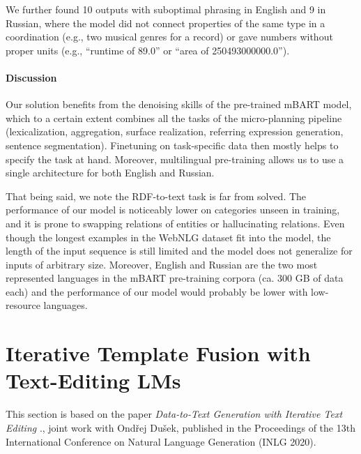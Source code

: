 We further found 10 outputs with suboptimal phrasing in English and 9 in Russian, where the model did not connect properties of the same type in a coordination (e.g., two musical genres for a record) or gave numbers without proper  units (e.g., “runtime of 89.0” or “area of 250493000000.0”).

\paragraph{Discussion}
Our solution benefits from the denoising skills of the pre-trained mBART model, which to a certain extent combines all the tasks of the micro-planning pipeline (lexicalization, aggregation, surface realization, referring expression generation, sentence segmentation). Finetuning on task-specific data then mostly helps to specify the task at hand. Moreover, multilingual pre-training allows us to use a single architecture for both English and Russian.

That being said, we note the RDF-to-text task is far from solved. The performance of our model is noticeably lower on categories unseen in training, and it is prone to swapping relations of entities or hallucinating relations. Even though the longest examples in the WebNLG dataset fit into the model, the length of the input sequence is still limited and the model does not generalize for inputs of arbitrary size.
Moreover, English and Russian are the two most represented languages in the mBART pre-training corpora (ca. 300 GB of data each) and the performance of our model would probably be lower with low-resource languages.





\section{Iterative Template Fusion with Text-Editing LMs}
\label{sec:iterative}

\begin{refbox}
    This section is based on the paper \emph{Data-to-Text Generation with Iterative Text Editing} \cite{kasnerDatatoTextGenerationIterative2020}., joint work with Ondřej Dušek, published in the Proceedings of the 13th International Conference on Natural Language Generation (INLG 2020).
\end{refbox}

